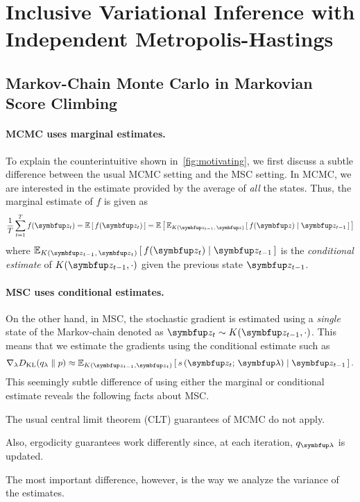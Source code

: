 
\section{Inclusive Variational Inference with Independent Metropolis-Hastings}
\subsection{Markov-Chain Monte Carlo in Markovian Score Climbing}\label{section:msc_mcmc}
\paragraph{MCMC uses marginal estimates.}
To explain the counterintuitive shown in~\cref{fig:motivating}, we first discuss a subtle difference between the usual MCMC setting and the MSC setting.
In MCMC, we are interested in the estimate provided by the average of \textit{all} the states.
Thus, the marginal estimate of \(f\) is given as
\begin{align}
  \frac{1}{T} \sum^{T}_{t=1} f(\vz_t) = \E{f(\vz_t)} = \E{\Esub{K(\vz_{t-1},\,\vz)}{ f(\vz) \mid \vz_{t-1}}}
\end{align}
where \(\Esub{K(\vz_{t-1},\,\vz_{t})}{ f(\vz_t) \mid \vz_{t-1}}\) is the \textit{conditional estimate} of \(K(\vz_{t-1},\cdot)\) given the previous state \(\vz_{t-1}\).

\paragraph{MSC uses conditional estimates.}
On the other hand, in MSC, the stochastic gradient is estimated using a \textit{single} state of the Markov-chain denoted as \(\vz_t \sim K(\vz_{t-1}, \cdot)\).
This means that we estimate the gradients using the conditional estimate such as
\begin{align}
  \nabla_{\lambda} \DKL{q_{\lambda}}{p} \approx \Esub{K(\vz_{t-1},\vz_t)}{s\,(\vz_t;\, \vlambda) \mid \vz_{t-1}}.
\end{align}
This seemingly subtle difference of using either the marginal or conditional estimate reveals the following facts about MSC.
\begin{enumerate*}[label=(\roman*)]
\item The usual central limit theorem (CLT) guarantees of MCMC do not apply.
\item Also, ergodicity guarantees work differently since, at each iteration, \(q_{\vlambda}\) is updated.
\end{enumerate*}
The most important difference, however, is the way we analyze the variance of the estimates.


